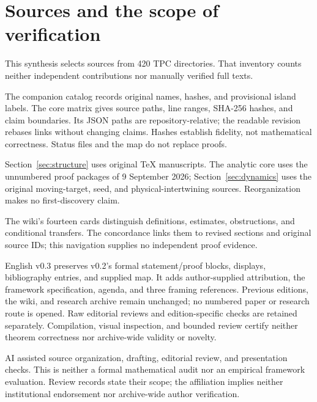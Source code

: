 \section{Sources and the scope of verification}\label{sec:provenance}
This synthesis selects sources from 420 TPC directories. That inventory counts neither independent contributions nor manually verified full texts.

The companion catalog records original names, hashes, and provisional island labels. The core matrix gives source paths, line ranges, SHA-256 hashes, and claim boundaries. Its JSON paths are repository-relative; the readable revision rebases links without changing claims. Hashes establish fidelity, not mathematical correctness. Status files and the map do not replace proofs.

Section~\ref{sec:structure} uses original TeX manuscripts. The analytic core uses the unnumbered proof packages of 9 September 2026; Section~\ref{sec:dynamics} uses the original moving-target, seed, and physical-intertwining sources. Reorganization makes no first-discovery claim.

The wiki's fourteen cards distinguish definitions, estimates, obstructions, and conditional transfers. The concordance links them to revised sections and original source IDs; this navigation supplies no independent proof evidence.

English v0.3 preserves v0.2's formal statement/proof blocks, displays, bibliography entries, and supplied map. It adds author-supplied attribution, the framework specification, agenda, and three framing references. Previous editions, the wiki, and research archive remain unchanged; no numbered paper or research route is opened. Raw editorial reviews and edition-specific checks are retained separately. Compilation, visual inspection, and bounded review certify neither theorem correctness nor archive-wide validity or novelty.

AI assisted source organization, drafting, editorial review, and presentation checks. This is neither a formal mathematical audit nor an empirical framework evaluation. Review records state their scope; the affiliation implies neither institutional endorsement nor archive-wide author verification.
